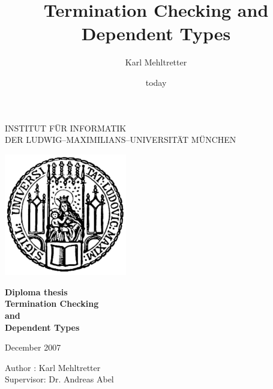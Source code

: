 \documentclass{book}
\begin{document}
\begin{titlepage}
\begin{center}

\vspace*{-2cm}

{\Huge INSTITUT F\"UR INFORMATIK\\[1mm]} %
DER LUDWIG--MAXIMILIANS--UNIVERSIT\"AT M\"UNCHEN\\

\vspace*{1cm}

\includegraphics[width=0.4\textwidth]{siegel.pdf}

\vspace*{2cm}

{\Large \textbf{Diploma thesis}}\\

\vspace{2.0cm}
{\Huge \textbf{Termination Checking}}\\
\vspace*{3mm}
{\Huge \textbf{and}}\\
\vspace*{3mm}
{\Huge \textbf{Dependent Types}}\\

\vspace{2cm}

\large{December 2007}

\vspace{1.5cm}

  \begin{Large}
      Author : Karl Mehltretter\\
      Supervisor: Dr. Andreas Abel
  \end{Large}


\end{center}
\end{titlepage} 



\title{Termination Checking and Dependent Types}
\author{Karl Mehltretter}
\date{today}
 

\tableofcontents






\end{document}
